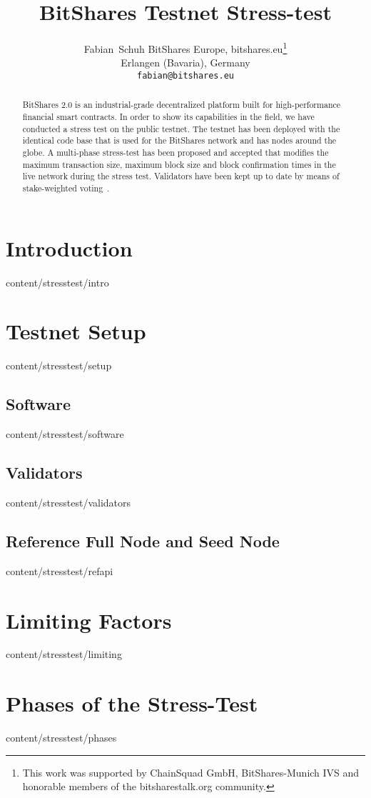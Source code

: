 \documentclass{btswhitepaper}
\title{BitShares Testnet Stress-test}
\author{
 Fabian~Schuh
 BitShares Europe, bitshares.eu\thanks{This work was supported by ChainSquad GmbH, BitShares-Munich IVS and honorable members of the bitsharestalk.org community.}\\
 Erlangen (Bavaria), Germany\\
 \texttt{fabian@bitshares.eu}
}
\begin{document}
\maketitle

\begin{abstract}%
 BitShares 2.0 is an industrial-grade decentralized platform built for
 high-performance financial smart contracts. In order to show its capabilities
 in the field, we have conducted a stress test on the public testnet. The
 testnet has been deployed with the identical code base that is used for
 the BitShares network and has nodes around the globe. A multi-phase
 stress-test has been proposed and accepted that modifies the maximum
 transaction size, maximum block size and block confirmation times in the live
 network during the stress test. Validators have been kept up to date by means
 of stake-weighted voting~\cite{bts:general}.
\end{abstract}

\section    { Introduction                       }  { content/stresstest/intro              } 
\section    { Testnet Setup                      }  { content/stresstest/setup              } 
\subsection { Software                           }  { content/stresstest/software           } 
\subsection { Validators                         }  { content/stresstest/validators         } 
\subsection { Reference Full Node and Seed Node  }  { content/stresstest/refapi             } 
\section    { Limiting Factors                   }  { content/stresstest/limiting           }
\section    { Phases of the Stress-Test          }  { content/stresstest/phases             } 
\end{document}
